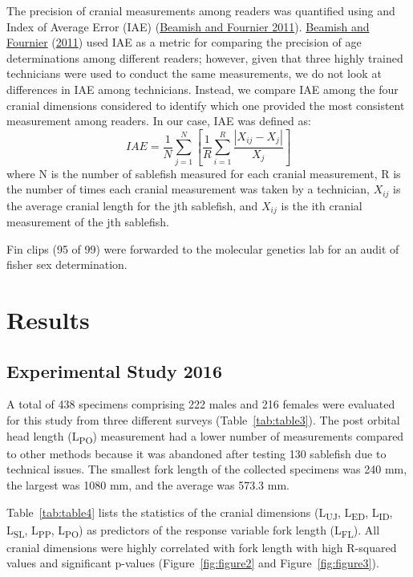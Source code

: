 \documentclass[12pt]{article}\usepackage[]{graphicx}\usepackage[]{color}
\begin{document}
The precision of cranial measurements among readers was quantified using and Index of Average Error (IAE) (\protect\hyperlink{ref-Beamish1981}{Beamish and Fournier 2011}). \protect\hyperlink{ref-Beamish1981}{Beamish and Fournier} (\protect\hyperlink{ref-Beamish1981}{2011}) used IAE as a metric for comparing the precision of age determinations among different readers; however, given that three highly trained technicians were used to conduct the same measurements, we do not look at differences in IAE among technicians. Instead, we compare IAE among the four cranial dimensions considered to identify which one provided the most consistent measurement among readers. In our case, IAE was defined as: \[
IAE=\frac{1}{N}\sum_{j = 1}^{N}\left[\frac{1}{R}\sum_{i = 1}^{R}\frac{|X_{ij} - X_j|}{X_j}\right]
\] where N is the number of sablefish measured for each cranial measurement, R is the number of times each cranial measurement was taken by a technician, \(X_{ij}\) is the average cranial length for the jth sablefish, and \(X_{ij}\) is the ith cranial measurement of the jth sablefish.

Fin clips (95 of 99) were forwarded to the molecular genetics lab for an audit of fisher sex determination.

\hypertarget{results}{%
\section{Results}\label{results}}

\hypertarget{experimental-study-2016-1}{%
\subsection{Experimental Study 2016}\label{experimental-study-2016-1}}

A total of 438 specimens comprising 222 males and 216 females were evaluated for this study from three different surveys (Table~\ref{tab:table3}). The post orbital head length (L\textsubscript{PO}) measurement had a lower number of measurements compared to other methods because it was abandoned after testing 130 sablefish due to technical issues. The smallest fork length of the collected specimens was 240 mm, the largest was 1080 mm, and the average was 573.3 mm.

Table~\ref{tab:table4} lists the statistics of the cranial dimensions (L\textsubscript{UJ}, L\textsubscript{ED}, L\textsubscript{ID}, L\textsubscript{SL}, L\textsubscript{PP}, L\textsubscript{PO}) as predictors of the response variable fork length (L\textsubscript{FL}). All cranial dimensions were highly correlated with fork length with high R-squared values and significant p-values (Figure~\ref{fig:figure2} and Figure~\ref{fig:figure3}).
\end{document}
